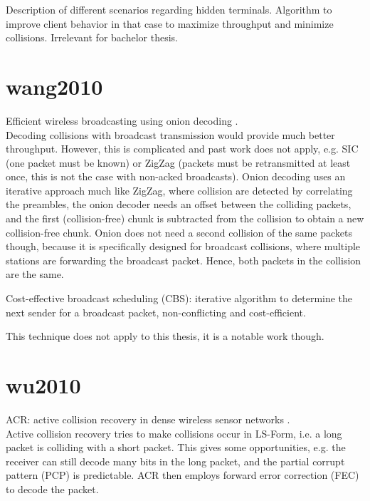 Description of different scenarios regarding hidden terminals. Algorithm to improve client behavior in that case to maximize throughput and minimize collisions. Irrelevant for bachelor thesis.



\section*{wang2010}

Efficient wireless broadcasting using onion decoding \cite{wang2010}.\\

Decoding collisions with broadcast transmission would provide much better throughput. However, this is complicated and past work does not apply, e.g. SIC (one packet must be known) or ZigZag \cite{gollakota2008} (packets must be retransmitted at least once, this is not the case with non-acked broadcasts). Onion decoding uses an iterative approach much like ZigZag, where collision are detected by correlating the preambles, the onion decoder needs an offset between the colliding packets, and the first (collision-free) chunk is subtracted from the collision to obtain a new collision-free chunk. Onion does not need a second collision of the same packets though, because it is specifically designed for broadcast collisions, where multiple stations are forwarding the broadcast packet. Hence, both packets in the collision are the same.

Cost-effective broadcast scheduling (CBS): iterative algorithm to determine the next sender for a broadcast packet, non-conflicting and cost-efficient.

This technique does not apply to this thesis, it is a notable work though.



\section*{wu2010}

ACR: active collision recovery in dense wireless sensor networks \cite{wu2010}.\\

Active collision recovery tries to make collisions occur in LS-Form, i.e. a long packet is colliding with a short packet. This gives some opportunities, e.g. the receiver can still decode many bits in the long packet, and the partial corrupt pattern (PCP) is predictable. ACR then employs forward error correction (FEC) to decode the packet.


